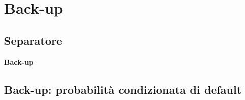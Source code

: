 \documentclass[handout]{beamer}%
\begin{document}

\section{Back-up}

\subsection{Separatore}

\begin{frame}%

\vfill
\begin{center}
{\Huge\bfseries Back-up}
\end{center}
\vfill

\transboxout%
\end{frame}%

\subsection{Back-up: probabilit\`{a} condizionata di default}
\end{document}
